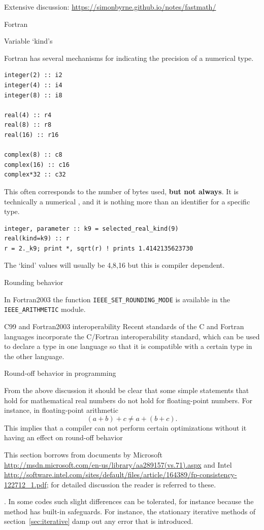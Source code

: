 Extensive discussion: \url{https://simonbyrne.github.io/notes/fastmath/}

 {Fortran}

 {Variable `kind's}
\label{sec:fprecision}

Fortran has several mechanisms for indicating the precision of a numerical type.
%
\begin{lstlisting}
integer(2) :: i2
integer(4) :: i4
integer(8) :: i8

real(4) :: r4
real(8) :: r8
real(16) :: r16

complex(8) :: c8
complex(16) :: c16
complex*32 :: c32
\end{lstlisting}

This often corresponds to the number of bytes used, \textbf{but not always}.
It is technically a numerical ,
and it is nothing more than an identifier for a specific type.

\begin{lstlisting}
integer, parameter :: k9 = selected_real_kind(9)
real(kind=k9) :: r
r = 2._k9; print *, sqrt(r) ! prints 1.4142135623730
\end{lstlisting}
The `kind' values will usually be 4,8,16 but this is compiler
dependent.

 {Rounding behavior}

In Fortran2003 the function \lstinline{IEEE_SET_ROUNDING_MODE}
is available in the \lstinline{IEEE_ARITHMETIC} module.

 {C99 and Fortran2003 interoperability}
%
Recent standards of the C and Fortran
languages incorporate the C/Fortran interoperability standard, which
can be used to declare a type in one language so that it is compatible
with a certain type in the other language.

 {Round-off behavior in programming}
\label{sec:round-compile}

From the above discussion it should be clear that some simple statements
that hold for mathematical real numbers do not hold for floating-point numbers.
For instance, in floating-point arithmetic 
\begin{equation}
  (a+b)+c\not=a+(b+c).
\end{equation}
This implies that a compiler can not perform certain optimizations
without it having an effect on round-off behavior
\begin{footnoteenv}
  {This
section borrows from documents by
Microsoft \url{http://msdn.microsoft.com/en-us/library/aa289157(vs.71).aspx}
and
Intel \url{http://software.intel.com/sites/default/files/article/164389/fp-consistency-122712_1.pdf};
for detailed discussion the reader is referred to these.}
\end{footnoteenv}
.  In some
codes such slight differences can be tolerated, for instance because
the method has built-in safeguards. For instance, the stationary
iterative methods of section~\ref{sec:iterative} damp out any error
that is introduced. 

